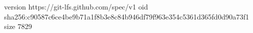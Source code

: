version https://git-lfs.github.com/spec/v1
oid sha256:c90587c6ce4be9b71a1f8b3e8c84b946df79f963e354c5361d365fd0d90a73f1
size 7829
